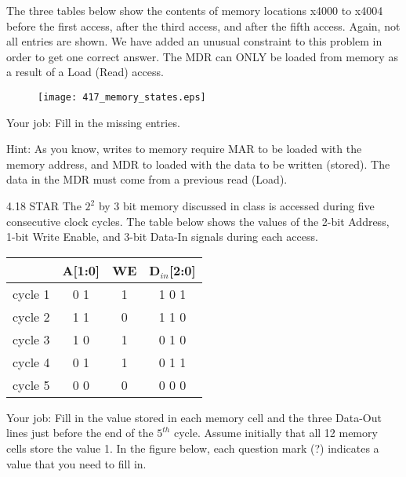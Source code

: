 \documentclass{patt}
\begin{document}
\begin{exercises}
\vspace{0.3in}

\noindent
The three tables below show the contents of memory locations x4000 to x4004
before the first access, after the third access, and after the fifth access.
Again, not all entries are shown. We have added an unusual constraint to this problem in order to get one correct answer.  The MDR can ONLY be loaded from memory as a result of a Load
(Read) access.\\

\begin{center}
\hspace{2.0in}
\begin{figure}[h]
\centering
\texttt{[image: 417\_memory\_states.eps]}
\end{figure}
\end{center}

\noindent
Your job: Fill in the missing entries.\\

\noindent

\noindent
Hint: As you know, writes to memory require MAR to be loaded with the memory
address, and MDR to loaded with the data to be written (stored).  The data in
the MDR must come from a previous read (Load).\\

\newpage
\item[4.18]STAR The $2^{2}$ by 3 bit memory discussed in class is accessed during five consecutive clock cycles.  The table below shows the values of the
2-bit Address, 1-bit Write Enable, and 3-bit Data-In signals during
each access.

\vspace{0.1in}
\begin{center}
\begin{tabular}{c|c|c|c}
    & A[1:0] & WE & D$_{in}$[2:0] \\
    \hline
    cycle 1 & 0 1 & 1 & 1 0 1\\
    cycle 2 & 1 1 & 0 & 1 1 0\\
    cycle 3 & 1 0 & 1 & 0 1 0\\
    cycle 4 & 0 1 & 1 & 0 1 1\\
    cycle 5 & 0 0 & 0 & 0 0 0\\
\end{tabular}
\end{center}

\vspace{0.1in}
\noindent Your job: Fill in the value stored in each memory cell and the three
Data-Out lines just before the end of the $5^{th}$ cycle.  Assume initially
that all 12 memory cells store the value 1.  In the figure below,
each question mark (?) indicates a value that you need to fill in.


\end{exercises}
\end{document}

